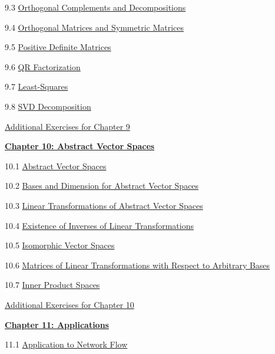 \documentclass{ximera}
\begin{document}
9.3	\href{https://ximera.osu.edu/oerlinalg/LinearAlgebra/RTH-0020/main}{Orthogonal Complements and Decompositions}
	
9.4	\href{https://ximera.osu.edu/oerlinalg/LinearAlgebra/RTH-0035/main}{Orthogonal Matrices and Symmetric Matrices}
	
9.5	\href{https://ximera.osu.edu/oerlinalg/LinearAlgebra/RTH-0045/main}{Positive Definite Matrices}
	
9.6	\href{https://ximera.osu.edu/oerlinalg/LinearAlgebra/RTH-0040/main}{QR Factorization}
	
9.7	\href{https://ximera.osu.edu/oerlinalg/LinearAlgebra/RTH-0030/main}{Least-Squares}
	
9.8	\href{https://ximera.osu.edu/oerlinalg/LinearAlgebra/RTH-0060/main}{SVD Decomposition}
	
\href{https://ximera.osu.edu/oerlinalg/LinearAlgebra/SUPX-0090/main}{Additional Exercises for Chapter 9}
	
\href{https://ximera.osu.edu/oerlinalg/LinearAlgebra/XLAChapter_vecSpaces/main}{\textbf{Chapter 10: Abstract Vector Spaces}}
	
10.1	\href{https://ximera.osu.edu/oerlinalg/LinearAlgebra/VSP-0050/main}{Abstract Vector Spaces}
	
10.2	\href{https://ximera.osu.edu/oerlinalg/LinearAlgebra/VSP-0060/main}{Bases and Dimension for Abstract Vector Spaces}
	
10.3	\href{https://ximera.osu.edu/oerlinalg/LinearAlgebra/LTR-0022/main}{Linear Transformations of Abstract Vector Spaces}
	
10.4	\href{https://ximera.osu.edu/oerlinalg/LinearAlgebra/LTR-0025/main}{Existence of Inverses of Linear Transformations}
	
10.5	\href{https://ximera.osu.edu/oerlinalg/LinearAlgebra/LTR-0035/main}{Isomorphic Vector Spaces}
	
10.6	\href{https://ximera.osu.edu/oerlinalg/LinearAlgebra/LTR-0060/main}{Matrices of Linear Transformations with Respect to Arbitrary Bases}
	
10.7	\href{https://ximera.osu.edu/oerlinalg/LinearAlgebra/LTR-0080/main}{Inner Product Spaces}
	
\href{https://ximera.osu.edu/oerlinalg/LinearAlgebra/SUPX-0100/main}{Additional Exercises for Chapter 10}
	
\href{https://ximera.osu.edu/oerlinalg/LinearAlgebra/XLAChapter_applications/main}{\textbf{Chapter 11: Applications}}
	
11.1	\href{https://ximera.osu.edu/oerlinalg/LinearAlgebra/APP-0010/main}{Application to Network Flow}
	
\end{document}
